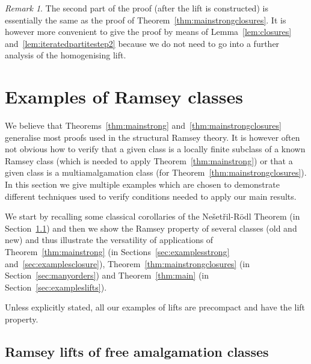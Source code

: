 \documentclass{elsarticle}
\theoremstyle{plain}
\theoremstyle{definition}
\theoremstyle{remark}
\newtheorem*{remark}{Remark}
\begin{document}
\begin{remark}The second part of the proof (after the lift is constructed) is essentially the same as the proof of Theorem~\ref{thm:mainstrongclosures}.
It is however more convenient to give the proof by means of Lemma~\ref{lem:closures} and~\ref{lem:iteratedpartitestep2} because we do
not need to go into a further analysis of the homogenising lift.
\end{remark}

\section{Examples of Ramsey classes}
\label{sec:examples}
We believe that Theorems~\ref{thm:mainstrong} and~\ref{thm:mainstrongclosures} generalise most proofs used in the structural Ramsey theory.
It is however often not obvious how to verify that a given class is a locally finite subclass of a known Ramsey class (which is needed to apply Theorem~\ref{thm:mainstrong})
or that a given class is a multiamalgamation class (for Theorem~\ref{thm:mainstrongclosures}). In this section we give multiple examples which are chosen to demonstrate different techniques used to verify conditions needed to apply our main results.

We start by recalling some classical corollaries of the Ne\v set\v ril-R\" odl Theorem (in Section~\ref{sec:graphs}) and then we show the Ramsey property of
several classes (old and new) and thus illustrate the versatility of applications of Theorem~\ref{thm:mainstrong} (in Sections~\ref{sec:examplesstrong} and~\ref{sec:examplesclosure}), Theorem~\ref{thm:mainstrongclosures} (in Section~\ref{sec:manyorders}) and Theorem~\ref{thm:main} (in Section~\ref{sec:exampleslifts}).

Unless explicitly
stated, all our examples of lifts are precompact and have the lift property. 

\subsection {Ramsey lifts of free amalgamation classes}
\label{sec:graphs}
\label{sec:bipgraphs}
\label{sec:acyclic}
\end{document}
